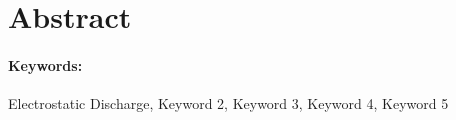 \label{section:abstract}
\section*{\centering Abstract}
\blindtext
\paragraph*{Keywords:} Electrostatic Discharge, Keyword 2, Keyword 3, Keyword 4, Keyword 5



